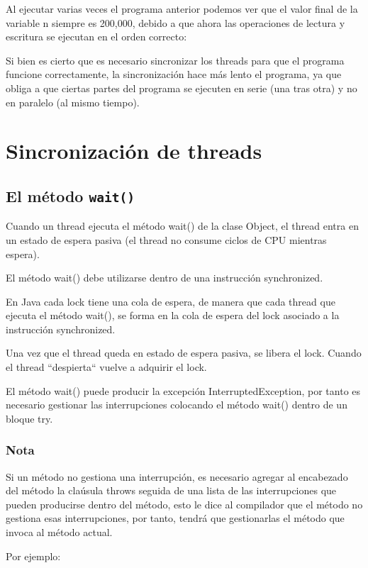 Al ejecutar varias veces el programa anterior podemos ver que el valor final de la variable n siempre es 200,000, debido a que ahora las operaciones de lectura y escritura se ejecutan en el orden correcto:

Si bien es cierto que es necesario sincronizar los threads para que el programa funcione correctamente, la sincronización hace más lento el programa, ya que obliga a que ciertas partes del programa se ejecuten en serie (una tras otra) y no en paralelo (al mismo tiempo).

\section{Sincronización de threads}

\subsection{El método \texttt{wait()}}

Cuando un thread ejecuta el método wait() de la clase Object, el thread entra en un estado de espera pasiva (el thread no consume ciclos de CPU mientras espera).

El método wait() debe utilizarse dentro de una instrucción synchronized.

En Java cada lock tiene una cola de espera, de manera que cada thread que ejecuta el método wait(), se forma en la cola de espera del lock asociado a la instrucción synchronized.

Una vez que el thread queda en estado de espera pasiva, se libera el lock. Cuando el thread ``despierta`` vuelve a adquirir el lock.

El método wait() puede producir la excepción InterruptedException, por tanto es necesario gestionar las interrupciones colocando el método wait() dentro de un bloque try.

\subsubsection{Nota}

Si un método no gestiona una interrupción, es necesario agregar al encabezado del método la claúsula throws seguida de una lista de las interrupciones que pueden producirse dentro del método, esto le dice al compilador que el método no gestiona esas interrupciones, por tanto, tendrá que gestionarlas el método que invoca al método actual.

Por ejemplo:

